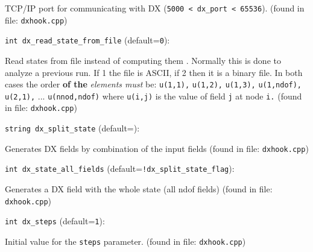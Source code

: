 TCP/IP port for communicating with DX ({\tt 5000 < dx\_port < 65536}). 
 (found in file: \verb+dxhook.cpp+)
\item\verb+int dx_read_state_from_file+ {\rm(default=\verb|0|)}:

Read states from file instead of computing them . Normally
 this is done to analyze a previous run. If 1 the file is
 ASCII, if 2 then it is a binary file. In both cases the order
 \textbf{of the} \emph{elements must} be: \verb+u(1,1),+ \verb+u(1,2),+ \verb+u(1,3),+
 \verb+u(1,ndof),+ \verb+u(2,1),+ ... \verb+u(nnod,ndof)+ where \verb+u(i,j)+ is
 the value of field \verb+j+ at node \verb+i.+ 
 (found in file: \verb+dxhook.cpp+)
\item\verb+string dx_split_state+ {\rm(default=\verb||)}:

Generates DX fields by combination of the input fields
 (found in file: \verb+dxhook.cpp+)
\item\verb+int dx_state_all_fields+ {\rm(default=\verb|!dx_split_state_flag|)}:

Generates a DX field with the whole state (all ndof fields)
 (found in file: \verb+dxhook.cpp+)
\item\verb+int dx_steps+ {\rm(default=\verb|1|)}:

Initial value for the {\tt steps} parameter. 
 (found in file: \verb+dxhook.cpp+)
